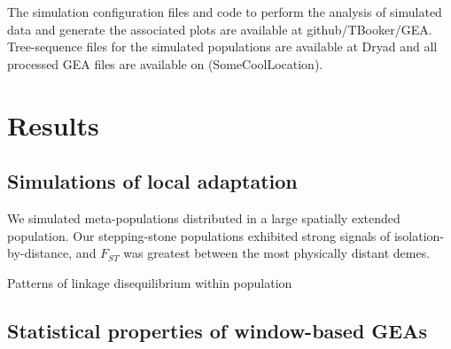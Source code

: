 \documentclass[11pt,twoside,lineno]{GSA_format}
\begin{document}
The simulation configuration files and code to perform the analysis of simulated data and generate the associated plots are available at github/TBooker/GEA. Tree-sequence files for the simulated populations are available at Dryad and all processed GEA files are available on (SomeCoolLocation). 

\section{Results}

\subsection{Simulations of local adaptation}

We simulated meta-populations distributed in a large spatially extended population. Our stepping-stone populations exhibited strong signals of isolation-by-distance, and $F_{ST}$ was greatest between the most physically distant demes.  

Patterns of linkage disequilibrium within population 



\subsection{Statistical properties of window-based GEAs}
\end{document}
